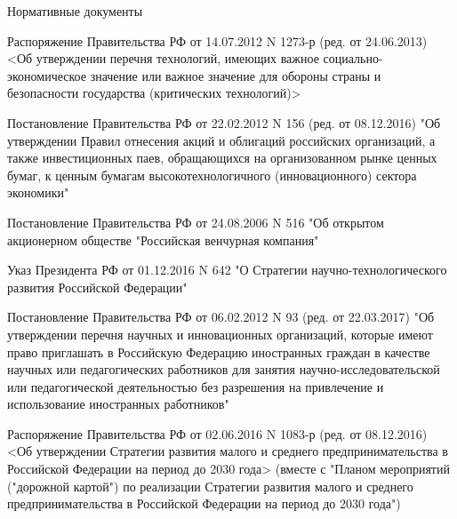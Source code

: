 \documentclass[_Venture_p1.tex]{subfiles}
\begin{document}
\begin{frame}[allowframebreaks]{Нормативные документы}
\begin{thebibliography}{10}
\pagebreak

Распоряжение Правительства РФ от 14.07.2012 N 1273-р (ред. от 24.06.2013) <Об утверждении перечня технологий, имеющих важное социально-экономическое значение или важное значение для обороны страны и безопасности государства (критических технологий)>

\pagebreak

Постановление Правительства РФ от 22.02.2012 N 156 (ред. от 08.12.2016) "Об утверждении Правил отнесения акций и облигаций российских организаций, а также инвестиционных паев, обращающихся на организованном рынке ценных бумаг, к ценным бумагам высокотехнологичного (инновационного) сектора экономики"

\pagebreak

Постановление Правительства РФ от 24.08.2006 N 516 "Об открытом акционерном обществе "Российская венчурная компания"

Указ Президента РФ от 01.12.2016 N 642 "О Стратегии научно-технологического развития Российской Федерации"

\pagebreak

Постановление Правительства РФ от 06.02.2012 N 93 (ред. от 22.03.2017) "Об утверждении перечня научных и инновационных организаций, которые имеют право приглашать в Российскую Федерацию иностранных граждан в качестве научных или педагогических работников для занятия научно-исследовательской или педагогической деятельностью без разрешения на привлечение и использование иностранных работников"

\pagebreak

Распоряжение Правительства РФ от 02.06.2016 N 1083-р (ред. от 08.12.2016) <Об утверждении Стратегии развития малого и среднего предпринимательства в Российской Федерации на период до 2030 года> (вместе с "Планом мероприятий ("дорожной картой") по реализации Стратегии развития малого и среднего предпринимательства в Российской Федерации на период до 2030 года")
  \end{thebibliography}
\end{frame}
\end{document}
